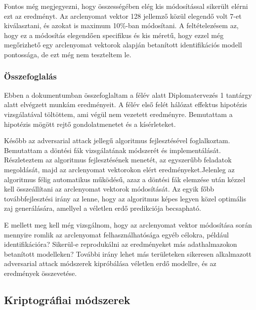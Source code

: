 Fontos még megjegyezni, hogy összességében elég kis módosítással sikerült elérni ezt az eredményt. Az arclenyomat vektor 128 jellemző közül elegendő volt 7-et kiválasztani, és azokat is maximum 10\%-ban módosítani. A feltételezésem az, hogy ez a módosítás elegendően specifikus és kis méretű, hogy ezzel még megőrizhető egy arclenyomat vektorok alapján betanított identifikációs modell pontossága, de ezt még nem teszteltem le.

\subsubsection*{Összefoglalás}

Ebben a dokumentumban összefoglaltam a félév alatt Diplomatervezés 1 tantárgy alatt elvégzett munkám eredményeit. A félév első felét hálózat effektus hipotézis vizsgálatával töltöttem, ami végül nem vezetett eredményre. Bemutattam a hipotézis mögött rejtő gondolatmenetet és a kísérleteket.

Később az adversarial attack jellegű algoritmus fejlesztésével foglalkoztam. Bemutattam a döntési fák vizsgálatának módszerét és implementálását. Részleteztem az algoritmus fejlesztésének menetét, az egyszerűbb feladatok megoldását, majd az arclenyomat vektorokon elért eredményeket.Jelenleg az algoritmus félig automatikus működésű, azaz a döntési fák elemzése után kézzel kell összeállítani az arclenyomat vektorok módosítását. Az egyik főbb továbbfejlesztési irány az lenne, hogy az algoritmus képes legyen közel optimális zaj generálására, amellyel a véletlen erdő predikciója becsapható. 

E mellett meg kell még vizsgálnom, hogy az arclenyomat vektor módosítása során mennyire romlik az arclenyomat felhasználhatósága egyéb célokra, például identifikációra? Sikerül-e reprodukálni az eredményeket más adathalmazokon betanított modelleken? További irány lehet más területeken sikeresen alkalmazott adversarial attack módszerek kipróbálása véletlen erdő modellre, és az eredmények összevetése.

\subsection{Kriptográfiai módszerek}


